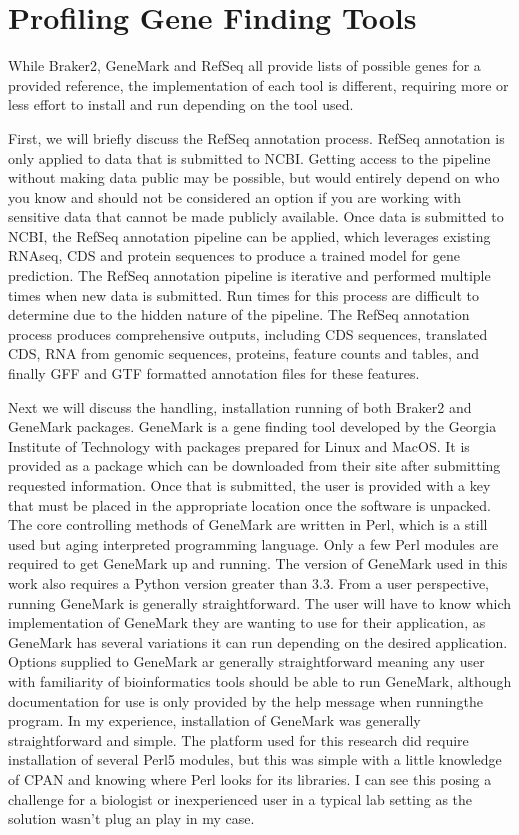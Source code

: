 \section{Profiling Gene Finding Tools}

While Braker2, GeneMark and RefSeq all provide lists of possible genes
for a provided reference, the implementation of each tool is
different, requiring more or less effort to install and run depending
on the tool used.

First, we will briefly discuss the RefSeq annotation process. RefSeq
annotation is only applied to data that is submitted to NCBI. Getting
access to the pipeline without making data public may be possible, but
would entirely depend on who you know and should not be considered an
option if you are working with sensitive data that cannot be made
publicly available. Once data is submitted to NCBI, the RefSeq
annotation pipeline can be applied, which leverages existing RNAseq,
CDS and protein sequences to produce a trained model for gene
prediction. The RefSeq annotation pipeline is iterative and performed
multiple times when new data is submitted. Run times for this process
are difficult to determine due to the hidden nature of the
pipeline. The RefSeq annotation process produces comprehensive
outputs, including CDS sequences, translated CDS, RNA from genomic
sequences, proteins, feature counts and tables, and finally GFF and GTF
formatted annotation files for these features.

Next we will discuss the handling, installation running of both
Braker2 and GeneMark packages. GeneMark is a gene finding tool
developed by the Georgia Institute of Technology with packages
prepared for Linux and MacOS. It is provided as a package which can be
downloaded from their site after submitting requested
information. Once that is submitted, the user is provided with a key
that must be placed in the appropriate location once the software is
unpacked. The core controlling methods of GeneMark are written in
Perl, which is a still used but aging interpreted programming
language. Only a few Perl modules are required to get GeneMark up and
running. The version of GeneMark used in this work also requires a
Python version greater than 3.3. From a user perspective, running
GeneMark is generally straightforward. The user will have to know
which implementation of GeneMark they are wanting to use for their
application, as GeneMark has several variations it can run depending
on the desired application. Options supplied to GeneMark ar generally
straightforward meaning any user with familiarity of bioinformatics
tools should be able to run GeneMark, although documentation for use
is only provided by the help message when runningthe program. In my
experience, installation of GeneMark was generally straightforward and
simple. The platform used for this research did require installation
of several Perl5 modules, but this was simple with a little knowledge
of CPAN and knowing where Perl looks for its libraries. I can see this
posing a challenge for a biologist or inexperienced user in a typical
lab setting as the solution wasn't plug an play in my case.

